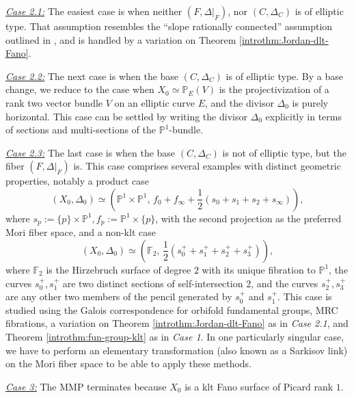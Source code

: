 \documentclass{amsart}
\theoremstyle{definition}
\theoremstyle{remark}
\numberwithin{equation}{section}
\begin{document}
\medskip

\hfill \begin{minipage}{0.95\textwidth}
\noindent\underline{\textit{Case 2.1:}} The easiest case is when neither $(F,\Delta|_F)$, nor $(C,\Delta_C)$ is of elliptic type. That assumption resembles the ``slope rationally connected'' assumption outlined in \cite[Conjecture 23]{AC23}, and is handled by a variation on Theorem \ref{introthm:Jordan-dlt-Fano}.

\medskip

\noindent\underline{\textit{Case 2.2:}} The next case is when the base $(C,\Delta_C)$ is of elliptic type. By a base change, we reduce to the case when $X_0\simeq \mathbb{P}_E(V)$ is the projectivization of a rank two vector bundle $V$ on an elliptic curve $E$, and the divisor $\Delta_0$ is purely horizontal. This case can be settled by writing the divisor $\Delta_0$ explicitly in terms of sections and multi-sections of the $\mathbb{P}^1$-bundle.

\medskip

\noindent\underline{\textit{Case 2.3:}} The last case is when the base $(C,\Delta_C)$ is not of elliptic type, but the fiber $(F,\Delta|_F)$ is. This case comprises several examples with distinct geometric properties, notably a product case $$(X_0,\Delta_0)\simeq \left(\mathbb{P}^1\times \mathbb{P}^1,\, f_0+f_{\infty}+\frac{1}{2}(s_0+s_1+s_2+s_{\infty})\right),$$ where $s_p := \{p\}\times \mathbb{P}^1, f_p := \mathbb{P}^1\times \{p\}$, with the second projection as the preferred Mori fiber space, and a non-klt case 
$$(X_0,\Delta_0)\simeq \left(\mathbb{F}_2,\, \frac{1}{2}(s^+_0+s^+_1+s^+_2+s^+_3)\right),$$ 
where $\mathbb{F}_2$ is the Hirzebruch surface of degree $2$ with its unique fibration to $\mathbb{P}^1$, the curves $s^+_0,s^+_1$ are two distinct sections of self-intersection $2$, and the curves $s^+_2,s^+_3$ are any other two members of the pencil generated by $s^+_0$ and $s^+_1$. This case is studied using the Galois correspondence for orbifold fundamental groups, MRC fibrations, a variation on Theorem \ref{introthm:Jordan-dlt-Fano} as in {\it Case 2.1}, and Theorem \ref{introthm:fun-group-klt} as in {\it Case 1}. In one particularly singular case, we have to perform an elementary transformation (also known as a Sarkisov link) on the Mori fiber space to be able to apply these methods.
\end{minipage}

\bigskip

\noindent\underline{\textit{Case 3:}} The MMP terminates because $X_0$ is a klt Fano surface of Picard rank $1$.
\end{document}
